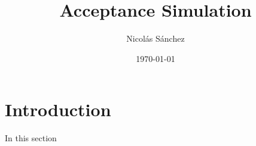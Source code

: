 \documentclass{article}
\title{Acceptance Simulation}
\author{Nicolás Sánchez}
\date{\today}
\begin{document}
\maketitle

\section{Introduction}
In this section
\end{document}
